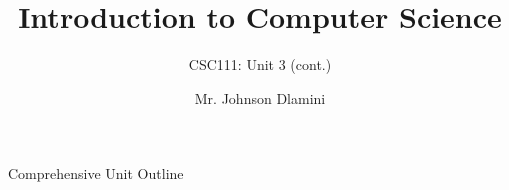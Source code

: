 \documentclass[aspectratio=169]{beamer}
\title[University of Eswatini]{Introduction to Computer Science
}
\subtitle{CSC111: Unit 3 (cont.)}
\author[J.S.D]{Mr. Johnson Dlamini}
\institute[jsdlamini@uniswa.sz]{ The University of Eswatini}
\date
\begin{document}
\frame{\titlepage}

\begin{frame}[fragile]{Comprehensive Unit Outline}
    \tableofcontents
\end{frame}


    
\end{document}
